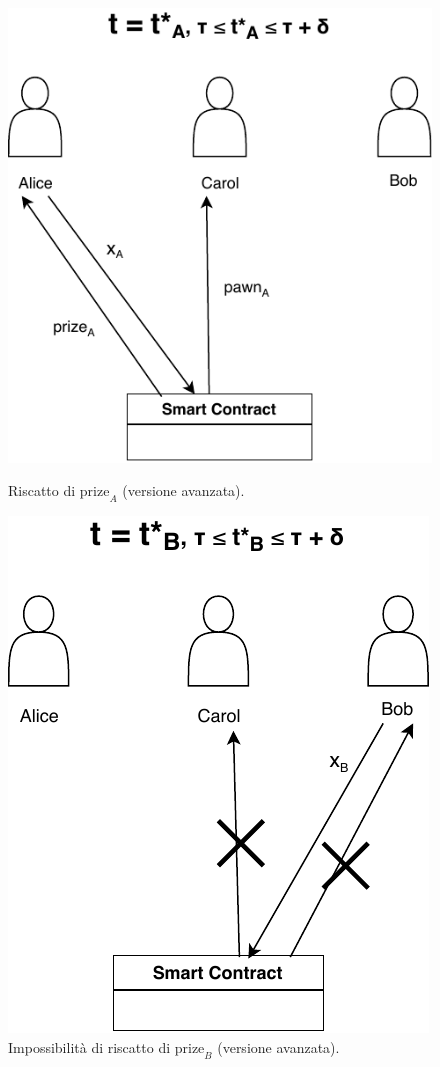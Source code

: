 \begin{figure}[H]
	\begin{minipage}{0.45\textwidth}
		\centering
		\includegraphics[width=.8\linewidth]{images/chap_protocollo/avanzato-leak-2-a.pdf}
		\caption{Riscatto di $ \text{prize}_A $ (versione avanzata).}
	\end{minipage}\hfill
	\begin{minipage}{0.45\textwidth}
		\centering
		\includegraphics[width=.71\linewidth]{images/chap_protocollo/avanzato-leak-2-b.pdf}
		\caption{Impossibilità di riscatto di $ \text{prize}_B $ (versione avanzata).}
	\end{minipage}
\end{figure}

